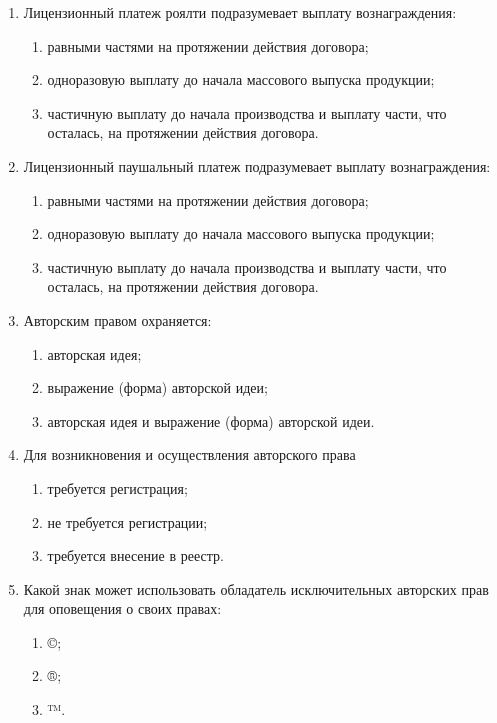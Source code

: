 \begin{enumerate}
\begin{enumerate}
    \end{enumerate}
    \item Лицензионный платеж роялти подразумевает выплату вознаграждения:
    \begin{enumerate}
        \item \cmark равными частями на протяжении действия договора;
        \item одноразовую выплату до начала массового выпуска продукции;
        \item частичную выплату до начала производства и выплату части, что осталась, на протяжении действия договора.
    \end{enumerate}
    \item Лицензионный паушальный  платеж подразумевает выплату вознаграждения:
    \begin{enumerate}
        \item равными частями на протяжении действия договора;
        \item \cmark одноразовую выплату до начала массового выпуска продукции;\item частичную выплату до начала производства и выплату части, что осталась, на протяжении действия договора.
    \end{enumerate}
    \item Авторским правом охраняется:
    \begin{enumerate}
        \item авторская идея;
        \item \cmark выражение (форма) авторской идеи;
        \item авторская идея и выражение (форма) авторской идеи.
    \end{enumerate}
    \item Для возникновения и осуществления авторского права
    \begin{enumerate}
        \item \cmark требуется регистрация;
        \item не требуется регистрации;
        \item требуется  внесение в реестр.
    \end{enumerate}
    \item Какой знак может использовать обладатель исключительных авторских прав для оповещения о своих правах:
    \begin{enumerate}
        \item \cmark ©;
        \item ®;
        \item ™.

\end{enumerate}
\end{enumerate}
